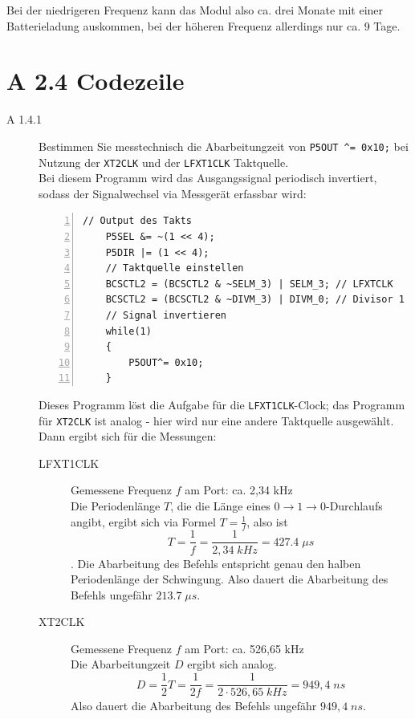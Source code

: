 \documentclass[11pt,a4paper,ngerman]{article}
\begin{document}
\begin{description}
Bei der niedrigeren Frequenz kann das Modul also ca. drei Monate mit einer Batterieladung auskommen, bei der höheren Frequenz allerdings nur ca. 9 Tage.

\end{description}

\section*{A 2.4 Codezeile}
\begin{description}
\item[A 1.4.1]Bestimmen Sie messtechnisch die Abarbeitungzeit von \texttt{P5OUT \textasciicircum = 0x10;} bei Nutzung der \texttt{XT2CLK} und der \texttt{LFXT1CLK} Taktquelle. \\

Bei diesem Programm wird das Ausgangssignal periodisch invertiert, sodass der Signalwechsel via Messgerät erfassbar wird:

\begin{lstlisting}[numbers=left]
	// Output des Takts
	P5SEL &= ~(1 << 4);
	P5DIR |= (1 << 4);
	// Taktquelle einstellen
	BCSCTL2 = (BCSCTL2 & ~SELM_3) | SELM_3; // LFXTCLK
	BCSCTL2 = (BCSCTL2 & ~DIVM_3) | DIVM_0; // Divisor 1
	// Signal invertieren
	while(1)
	{
		P5OUT^= 0x10;
	}
\end{lstlisting}  
Dieses Programm löst die Aufgabe für die \texttt{LFXT1CLK}-Clock; das Programm für \texttt{XT2CLK} ist analog - hier wird nur eine andere Taktquelle ausgewählt.\\
Dann ergibt sich für die Messungen:
\begin{description}
\item[LFXT1CLK] Gemessene Frequenz $f$ am Port: ca. 2,34 kHz \\
Die Periodenlänge $T$, die die Länge eines $0 \rightarrow 1 \rightarrow 0$-Durchlaufs angibt, ergibt sich via Formel $T = \frac{1}{f}$, also ist
$$ T = \frac{1}{f} = \frac{1}{2,34 \; kHz} = 427.4 \; \mu s $$.
Die Abarbeitung des Befehls entspricht genau den halben Periodenlänge der Schwingung. Also dauert die Abarbeitung des Befehls ungefähr $213.7 \; \mu s$.

\item[XT2CLK] Gemessene Frequenz $f$ am Port: ca. 526,65 kHz \\
Die Abarbeitungzeit $D$ ergibt sich analog.
$$ D = \frac{1}{2} T = \frac{1}{2 f} = \frac{1}{2 \cdot 526,65 \; kHz} = 949,4 \;  ns  $$
Also dauert die Abarbeitung des Befehls ungefähr $949,4 \;  ns$.
\end{description}     
\end{description}
\label{LastPage}
\end{document}
